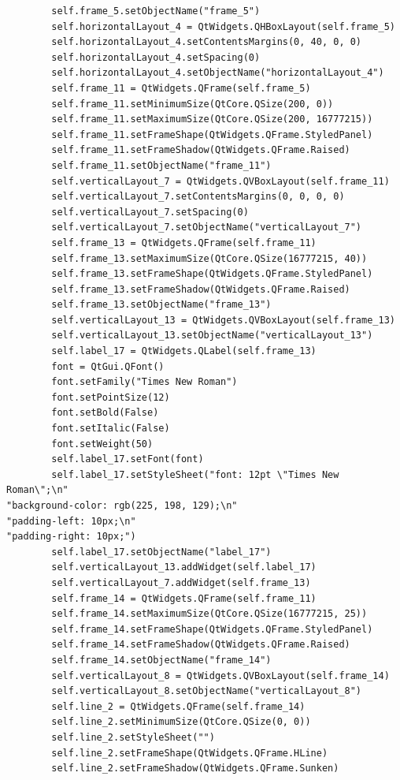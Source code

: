 \documentclass[12pt]{article}
\begin{document}
\begin{verbatim}
        self.frame_5.setObjectName("frame_5")
        self.horizontalLayout_4 = QtWidgets.QHBoxLayout(self.frame_5)
        self.horizontalLayout_4.setContentsMargins(0, 40, 0, 0)
        self.horizontalLayout_4.setSpacing(0)
        self.horizontalLayout_4.setObjectName("horizontalLayout_4")
        self.frame_11 = QtWidgets.QFrame(self.frame_5)
        self.frame_11.setMinimumSize(QtCore.QSize(200, 0))
        self.frame_11.setMaximumSize(QtCore.QSize(200, 16777215))
        self.frame_11.setFrameShape(QtWidgets.QFrame.StyledPanel)
        self.frame_11.setFrameShadow(QtWidgets.QFrame.Raised)
        self.frame_11.setObjectName("frame_11")
        self.verticalLayout_7 = QtWidgets.QVBoxLayout(self.frame_11)
        self.verticalLayout_7.setContentsMargins(0, 0, 0, 0)
        self.verticalLayout_7.setSpacing(0)
        self.verticalLayout_7.setObjectName("verticalLayout_7")
        self.frame_13 = QtWidgets.QFrame(self.frame_11)
        self.frame_13.setMaximumSize(QtCore.QSize(16777215, 40))
        self.frame_13.setFrameShape(QtWidgets.QFrame.StyledPanel)
        self.frame_13.setFrameShadow(QtWidgets.QFrame.Raised)
        self.frame_13.setObjectName("frame_13")
        self.verticalLayout_13 = QtWidgets.QVBoxLayout(self.frame_13)
        self.verticalLayout_13.setObjectName("verticalLayout_13")
        self.label_17 = QtWidgets.QLabel(self.frame_13)
        font = QtGui.QFont()
        font.setFamily("Times New Roman")
        font.setPointSize(12)
        font.setBold(False)
        font.setItalic(False)
        font.setWeight(50)
        self.label_17.setFont(font)
        self.label_17.setStyleSheet("font: 12pt \"Times New Roman\";\n"
"background-color: rgb(225, 198, 129);\n"
"padding-left: 10px;\n"
"padding-right: 10px;")
        self.label_17.setObjectName("label_17")
        self.verticalLayout_13.addWidget(self.label_17)
        self.verticalLayout_7.addWidget(self.frame_13)
        self.frame_14 = QtWidgets.QFrame(self.frame_11)
        self.frame_14.setMaximumSize(QtCore.QSize(16777215, 25))
        self.frame_14.setFrameShape(QtWidgets.QFrame.StyledPanel)
        self.frame_14.setFrameShadow(QtWidgets.QFrame.Raised)
        self.frame_14.setObjectName("frame_14")
        self.verticalLayout_8 = QtWidgets.QVBoxLayout(self.frame_14)
        self.verticalLayout_8.setObjectName("verticalLayout_8")
        self.line_2 = QtWidgets.QFrame(self.frame_14)
        self.line_2.setMinimumSize(QtCore.QSize(0, 0))
        self.line_2.setStyleSheet("")
        self.line_2.setFrameShape(QtWidgets.QFrame.HLine)
        self.line_2.setFrameShadow(QtWidgets.QFrame.Sunken)

\end{verbatim}
\end{document}
